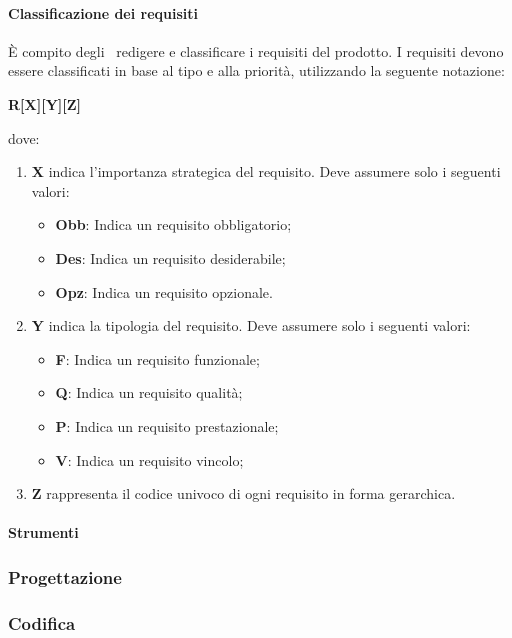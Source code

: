\documentclass[../NormeProgetto.tex]{subfiles}
\begin{document}
			\paragraph{Classificazione dei requisiti}
			È compito degli \analisti\ redigere e classificare i requisiti del prodotto.  I requisiti devono essere classificati in base al tipo e alla priorità, utilizzando la seguente notazione:
			\begin{center}\textbf{R[X][Y][Z]}\end{center} dove:
				\begin{enumerate}
					\item \textbf{X} indica l'importanza strategica del requisito. Deve assumere solo i seguenti valori:
						\begin{itemize}
							\item \textbf{Obb}: Indica un requisito obbligatorio;
							\item \textbf{Des}: Indica un requisito desiderabile;
							\item \textbf{Opz}: Indica un requisito opzionale.
						\end{itemize}
					\item \textbf{Y} indica la tipologia del requisito. Deve assumere solo i seguenti valori:
						\begin{itemize}
							\item \textbf{F}: Indica un requisito funzionale;
							\item \textbf{Q}: Indica un requisito qualità;
							\item \textbf{P}: Indica un requisito prestazionale;
							\item \textbf{V}: Indica un requisito vincolo;
						\end{itemize}
					\item \textbf{Z} rappresenta il codice univoco di ogni requisito in forma gerarchica.
				\end{enumerate}
			\paragraph{Strumenti}
		\subsubsection{Progettazione}
		\subsubsection{Codifica}
\end{document}
